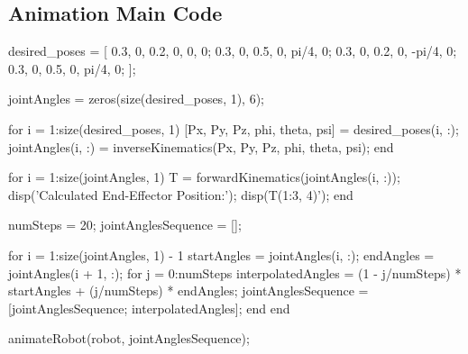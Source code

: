 \documentclass[conference]{IEEEtran}
\begin{document}
\subsection{Animation Main Code}
\begin{matlabcode}[label={AnimateMainAppendix}]
desired_poses = [
    0.3, 0, 0.2, 0, 0, 0;      %
    0.3, 0, 0.5, 0, pi/4, 0;   %
    0.3, 0, 0.2, 0, -pi/4, 0;  %
    0.3, 0, 0.5, 0, pi/4, 0;   %
];

jointAngles = zeros(size(desired_poses, 1), 6);

for i = 1:size(desired_poses, 1)
    [Px, Py, Pz, phi, theta, psi] = desired_poses(i, :);
    jointAngles(i, :) = inverseKinematics(Px, Py, Pz, phi, theta, psi);
end

for i = 1:size(jointAngles, 1)
    T = forwardKinematics(jointAngles(i, :));
    disp('Calculated End-Effector Position:');
    disp(T(1:3, 4)');  %
end

numSteps = 20;
jointAnglesSequence = [];

for i = 1:size(jointAngles, 1) - 1
    startAngles = jointAngles(i, :);
    endAngles = jointAngles(i + 1, :);
    for j = 0:numSteps
        interpolatedAngles = (1 - j/numSteps) * startAngles + (j/numSteps) * endAngles;
        jointAnglesSequence = [jointAnglesSequence; interpolatedAngles];
    end
end

animateRobot(robot, jointAnglesSequence);
\end{matlabcode}
\end{document}
